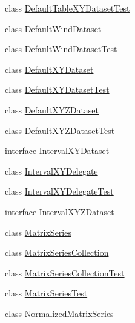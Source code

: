 \begin{DoxyCompactItemize}
\item 
class \mbox{\hyperlink{classorg_1_1jfree_1_1data_1_1xy_1_1_default_table_x_y_dataset_test}{Default\+Table\+X\+Y\+Dataset\+Test}}
\item 
class \mbox{\hyperlink{classorg_1_1jfree_1_1data_1_1xy_1_1_default_wind_dataset}{Default\+Wind\+Dataset}}
\item 
class \mbox{\hyperlink{classorg_1_1jfree_1_1data_1_1xy_1_1_default_wind_dataset_test}{Default\+Wind\+Dataset\+Test}}
\item 
class \mbox{\hyperlink{classorg_1_1jfree_1_1data_1_1xy_1_1_default_x_y_dataset}{Default\+X\+Y\+Dataset}}
\item 
class \mbox{\hyperlink{classorg_1_1jfree_1_1data_1_1xy_1_1_default_x_y_dataset_test}{Default\+X\+Y\+Dataset\+Test}}
\item 
class \mbox{\hyperlink{classorg_1_1jfree_1_1data_1_1xy_1_1_default_x_y_z_dataset}{Default\+X\+Y\+Z\+Dataset}}
\item 
class \mbox{\hyperlink{classorg_1_1jfree_1_1data_1_1xy_1_1_default_x_y_z_dataset_test}{Default\+X\+Y\+Z\+Dataset\+Test}}
\item 
interface \mbox{\hyperlink{interfaceorg_1_1jfree_1_1data_1_1xy_1_1_interval_x_y_dataset}{Interval\+X\+Y\+Dataset}}
\item 
class \mbox{\hyperlink{classorg_1_1jfree_1_1data_1_1xy_1_1_interval_x_y_delegate}{Interval\+X\+Y\+Delegate}}
\item 
class \mbox{\hyperlink{classorg_1_1jfree_1_1data_1_1xy_1_1_interval_x_y_delegate_test}{Interval\+X\+Y\+Delegate\+Test}}
\item 
interface \mbox{\hyperlink{interfaceorg_1_1jfree_1_1data_1_1xy_1_1_interval_x_y_z_dataset}{Interval\+X\+Y\+Z\+Dataset}}
\item 
class \mbox{\hyperlink{classorg_1_1jfree_1_1data_1_1xy_1_1_matrix_series}{Matrix\+Series}}
\item 
class \mbox{\hyperlink{classorg_1_1jfree_1_1data_1_1xy_1_1_matrix_series_collection}{Matrix\+Series\+Collection}}
\item 
class \mbox{\hyperlink{classorg_1_1jfree_1_1data_1_1xy_1_1_matrix_series_collection_test}{Matrix\+Series\+Collection\+Test}}
\item 
class \mbox{\hyperlink{classorg_1_1jfree_1_1data_1_1xy_1_1_matrix_series_test}{Matrix\+Series\+Test}}
\item 
class \mbox{\hyperlink{classorg_1_1jfree_1_1data_1_1xy_1_1_normalized_matrix_series}{Normalized\+Matrix\+Series}}
\item 

\end{DoxyCompactItemize}
